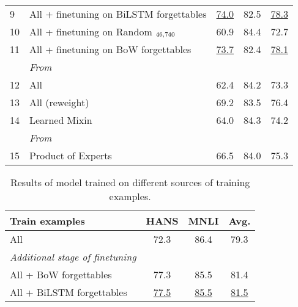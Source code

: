 \begin{table*}[ht]
\begin{tabular}{llccc}
\small{9} & All + finetuning on BiLSTM forgettables &  \underline{74.0}                     & 82.5             & \underline{78.3} \\
\small{10} & \hspace{0.1cm} All + finetuning on Random $_{46,740}$       & 60.9                     & 84.4                         & 72.7  \\
\small{11} & All + finetuning on BoW forgettables    & \underline{73.7}                     & 82.4             & \underline{78.1} \\
\midrule
&\emph{From~\cite{clark2019dont}} & & & \\
\small{12} & All & 62.4 & 84.2 & 73.3 \\
\small{13} & All (reweight) & 69.2 & 83.5 & 76.4 \\
\small{14} & Learned Mixin & 64.0 & 84.3 & 74.2\\
\midrule
&\emph{From~\cite{mahabadi2019simple}} & & &  \\
\small{15} & Product of Experts & 66.5 & 84.0 & 75.3     \\
\bottomrule
\end{tabular}
\end{table*}

\begin{table}[ht]
\caption{Results of \bertlarge model trained on different sources of training examples.}
\small
\label{tab:bertlarge}
\centering
\begin{tabular}{lccc}
\toprule
\textbf{Train examples} & \textbf{HANS} & \textbf{MNLI} & \textbf{Avg.}  \\
\midrule
All & 72.3 & 86.4 &  79.3 \\
\midrule
\emph{Additional stage of finetuning} & & &\\
All + BoW forgettables & 77.3 & 85.5 & 81.4 \\
All + BiLSTM forgettables & \underline{77.5} & \underline{85.5} & \underline{81.5} \\
\bottomrule
\end{tabular}
\end{table}

